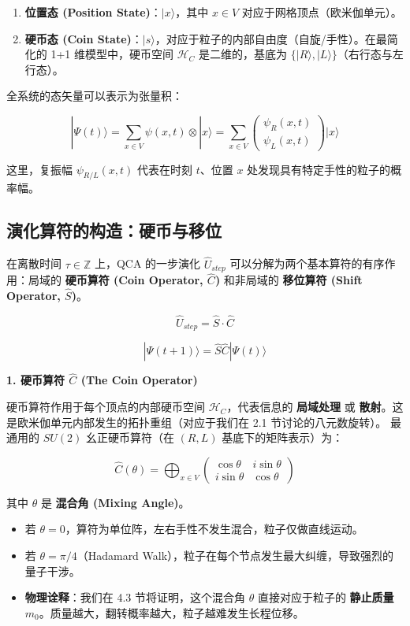 \begin{enumerate}
\item \textbf{位置态 (Position State)}：$|x\rangle$，其中 $x \in V$ 对应于网格顶点（欧米伽单元）。
\item \textbf{硬币态 (Coin State)}：$|s\rangle$，对应于粒子的内部自由度（自旋/手性）。在最简化的 1+1 维模型中，硬币空间 $\mathcal{H}_C$ 是二维的，基底为 $\{|R\rangle, |L\rangle\}$（右行态与左行态）。
\end{enumerate}

全系统的态矢量可以表示为张量积：

\[|\Psi(t)\rangle = \sum_{x \in V} \psi(x, t) \otimes |x\rangle = \sum_{x \in V} \begin{pmatrix} \psi_R(x, t) \\ \psi_L(x, t) \end{pmatrix} |x\rangle\]

这里，复振幅 $\psi_{R/L}(x, t)$ 代表在时刻 $t$、位置 $x$ 处发现具有特定手性的粒子的概率幅。

\subsection{演化算符的构造：硬币与移位}

在离散时间 $\tau \in \mathbb{Z}$ 上，QCA 的一步演化 $\hat{U}_{step}$ 可以分解为两个基本算符的有序作用：局域的 \textbf{硬币算符 (Coin Operator, $\hat{C}$)} 和非局域的 \textbf{移位算符 (Shift Operator, $\hat{S}$)}。

\[\hat{U}_{step} = \hat{S} \cdot \hat{C}\]

\[|\Psi(t+1)\rangle = \hat{S} \hat{C} |\Psi(t)\rangle\]

\textbf{1. 硬币算符 $\hat{C}$ (The Coin Operator)}

硬币算符作用于每个顶点的内部硬币空间 $\mathcal{H}_C$，代表信息的 \textbf{局域处理} 或 \textbf{散射}。这是欧米伽单元内部发生的拓扑重组（对应于我们在 2.1 节讨论的八元数旋转）。
最通用的 $SU(2)$ 幺正硬币算符（在 $(R, L)$ 基底下的矩阵表示）为：

\[\hat{C}(\theta) = \bigoplus_{x \in V} \begin{pmatrix} \cos \theta & i \sin \theta \\ i \sin \theta & \cos \theta \end{pmatrix}\]

其中 $\theta$ 是 \textbf{混合角 (Mixing Angle)}。

\begin{itemize}
\item 若 $\theta = 0$，算符为单位阵，左右手性不发生混合，粒子仅做直线运动。
\item 若 $\theta = \pi/4$（Hadamard Walk），粒子在每个节点发生最大纠缠，导致强烈的量子干涉。
\item \textbf{物理诠释}：我们在 4.3 节将证明，这个混合角 $\theta$ 直接对应于粒子的 \textbf{静止质量} $m_0$。质量越大，翻转概率越大，粒子越难发生长程位移。
\end{itemize}

